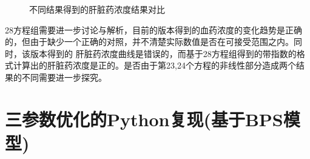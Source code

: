 \documentclass{article}
\begin{document}
\begin{figure}
  \centering
  \caption{不同结果得到的肝脏药浓度结果对比}
  \label{fig:main5}
\end{figure}

28方程组需要进一步讨论与解析，目前的版本得到的血药浓度的变化趋势是正确的，但由于缺少一个正确的对照，并不清楚实际数值是否在可接受范围之内。同时，该版本得到的
肝脏药浓度曲线是错误的，而基于28方程组得到的带指数的格式计算出的肝脏药浓度是正的。是否由于第23,24个方程的非线性部分造成两个结果的不同需要进一步探究。

\section*{三参数优化的Python复现(基于BPS模型)}
\end{document}
